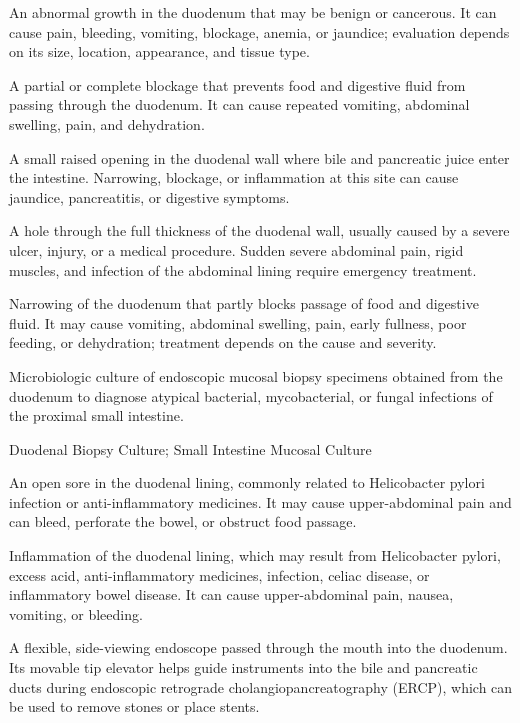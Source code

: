  An abnormal growth in the duodenum that may be benign or cancerous. It can cause pain, bleeding, vomiting, blockage, anemia, or jaundice; evaluation depends on its size, location, appearance, and tissue type.

 A partial or complete blockage that prevents food and digestive fluid from passing through the duodenum. It can cause repeated vomiting, abdominal swelling, pain, and dehydration.

 A small raised opening in the duodenal wall where bile and pancreatic juice enter the intestine. Narrowing, blockage, or inflammation at this site can cause jaundice, pancreatitis, or digestive symptoms.

 A hole through the full thickness of the duodenal wall, usually caused by a severe ulcer, injury, or a medical procedure. Sudden severe abdominal pain, rigid muscles, and infection of the abdominal lining require emergency treatment.

 Narrowing of the duodenum that partly blocks passage of food and digestive fluid. It may cause vomiting, abdominal swelling, pain, early fullness, poor feeding, or dehydration; treatment depends on the cause and severity.

 Microbiologic culture of endoscopic mucosal biopsy specimens obtained from the duodenum to diagnose atypical bacterial, mycobacterial, or fungal infections of the proximal small intestine.

\synonyms
Duodenal Biopsy Culture; Small Intestine Mucosal Culture

 An open sore in the duodenal lining, commonly related to Helicobacter pylori infection or anti-inflammatory medicines. It may cause upper-abdominal pain and can bleed, perforate the bowel, or obstruct food passage.

 Inflammation of the duodenal lining, which may result from Helicobacter pylori, excess acid, anti-inflammatory medicines, infection, celiac disease, or inflammatory bowel disease. It can cause upper-abdominal pain, nausea, vomiting, or bleeding.

 A flexible, side-viewing endoscope passed through the mouth into the duodenum. Its movable tip elevator helps guide instruments into the bile and pancreatic ducts during endoscopic retrograde cholangiopancreatography (ERCP), which can be used to remove stones or place stents.

